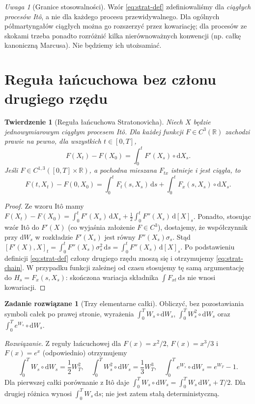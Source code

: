 \documentclass[11pt,a4paper,oneside]{report}
\numberwithin{equation}{chapter}
\theoremstyle{plain}
\newtheorem{twierdzenie}{Twierdzenie}[chapter]
\theoremstyle{definition}
\newtheorem{zadanie}{Zadanie rozwiązane}[chapter]
\theoremstyle{remark}
\newtheorem{uwaga}{Uwaga}[chapter]
\newcommand{\R}{\mathbb{R}}
\newcommand{\dd}{\mathrm{d}}
\begin{document}
\begin{uwaga}[Granice stosowalności]
Wzór \eqref{eq:strat-def} zdefiniowaliśmy dla
\emph{ciągłych procesów Itô}, a nie dla każdego
procesu przewidywalnego. Dla ogólnych
półmartyngałów ciągłych można go rozszerzyć przez
kowariację; dla procesów ze skokami trzeba ponadto
rozróżnić kilka nierównoważnych konwencji (np.
całkę kanoniczną Marcusa). Nie będziemy ich utożsamiać.
\end{uwaga}

\section{Reguła łańcuchowa bez członu drugiego rzędu}
\begin{twierdzenie}[Reguła łańcuchowa Stratonovicha]
\label{th:strat-chain}
Niech $X$ będzie jednowymiarowym ciągłym procesem
Itô. Dla każdej funkcji $F\in C^3(\R)$ zachodzi
prawie na pewno, dla wszystkich $t\in[0,T]$,
\[
F(X_t)-F(X_0)=\int_0^t F'(X_s)\circ\dd X_s.
\tag{4.5}\label{eq:strat-chain}
\]
Jeśli $F\in C^{1,3}([0,T]\times\R)$, a pochodna mieszana
$F_{tx}$ istnieje i jest ciągła, to
\[
F(t,X_t)-F(0,X_0)
=\int_0^tF_t(s,X_s)\,\dd s
+\int_0^tF_x(s,X_s)\circ\dd X_s.
\tag{4.6}\label{eq:strat-chain-time}
\]
\end{twierdzenie}
\begin{proof}
Ze wzoru Itô mamy
$F(X_t)-F(X_0)=\int_0^tF'(X_s)\,\dd X_s
+\frac12\int_0^tF''(X_s)\,\dd[X]_s$.
Ponadto, stosując wzór Itô do $F'(X)$
(co wyjaśnia założenie $F\in C^3$),
dostajemy, że współczynnik przy $\dd W_s$ w
rozkładzie $F'(X_s)$ jest równy
$F''(X_s)\sigma_s$. Stąd
$[F'(X),X]_t=\int_0^tF''(X_s)\sigma_s^2\,\dd s
=\int_0^tF''(X_s)\,\dd[X]_s$.
Po podstawieniu definicji \eqref{eq:strat-def}
człony drugiego rzędu znoszą się i otrzymujemy
\eqref{eq:strat-chain}. W przypadku funkcji zależnej
od czasu stosujemy tę samą argumentację do
$H_s=F_x(s,X_s)$: skończona wariacja składnika
$\int F_{xt}\,\dd s$ nie wnosi kowariacji.
\end{proof}

\begin{zadanie}[Trzy elementarne całki]
Obliczyć, bez pozostawiania symboli całek po prawej
stronie, wyrażenia
$\int_0^TW_s\circ\dd W_s$,
$\int_0^TW_s^2\circ\dd W_s$
oraz $\int_0^Te^{W_s}\circ\dd W_s$.

\emph{Rozwiązanie.} Z reguły łańcuchowej dla
$F(x)=x^2/2$, $F(x)=x^3/3$ i $F(x)=e^x$
(odpowiednio) otrzymujemy
\[
\int_0^TW_s\circ\dd W_s=\frac12W_T^2,
\quad \int_0^TW_s^2\circ\dd W_s=\frac13W_T^3,
\quad \int_0^Te^{W_s}\circ\dd W_s=e^{W_T}-1.
\]
Dla pierwszej całki porównanie z Itô daje
$\int_0^T W_s\circ\dd W_s
=\int_0^TW_s\,\dd W_s+T/2$.
Dla drugiej różnica wynosi $\int_0^TW_s\,\dd s$;
nie jest zatem stałą deterministyczną.
\end{zadanie}
\end{document}
